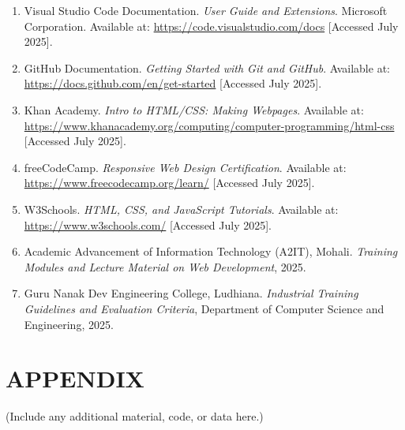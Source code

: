 \documentclass[a4paper,12pt,oneside]{report}
\numberwithin{equation}{chapter}
\numberwithin{figure}{chapter}
\numberwithin{table}{chapter}
\begin{document}
\begin{enumerate}
    \item Visual Studio Code Documentation. \textit{User Guide and Extensions}. Microsoft Corporation. Available at: \url{https://code.visualstudio.com/docs} [Accessed July 2025].

    \item GitHub Documentation. \textit{Getting Started with Git and GitHub}. Available at: \url{https://docs.github.com/en/get-started} [Accessed July 2025].

    \item Khan Academy. \textit{Intro to HTML/CSS: Making Webpages}. Available at: \url{https://www.khanacademy.org/computing/computer-programming/html-css} [Accessed July 2025].

    \item freeCodeCamp. \textit{Responsive Web Design Certification}. Available at: \url{https://www.freecodecamp.org/learn/} [Accessed July 2025].

    \item W3Schools. \textit{HTML, CSS, and JavaScript Tutorials}. Available at: \url{https://www.w3schools.com/} [Accessed July 2025].

    \item Academic Advancement of Information Technology (A2IT), Mohali. \textit{Training Modules and Lecture Material on Web Development}, 2025.

    \item Guru Nanak Dev Engineering College, Ludhiana. \textit{Industrial Training Guidelines and Evaluation Criteria}, Department of Computer Science and Engineering, 2025.
\end{enumerate}

\appendix
\chapter*{APPENDIX}
(Include any additional material, code, or data here.)
\end{document}
